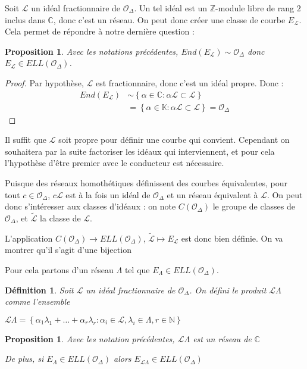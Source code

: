 \documentclass{article}
\newcommand{\N}[0]{\mathbb{N}}
\newcommand{\Z}[0]{\mathbb{Z}}
\newcommand{\C}[0]{\mathbb{C}}
\newcommand{\K}[0]{\mathbb{K}}
\newcommand{\OR}[0]{\mathcal{O}}
\newcommand{\LR}[0]{\mathcal{L}}
\newcommand{\CL}[0]{\tilde{\LR}}
\newtheorem{Prop}[The]{Proposition}
\newtheorem{Def}[The]{Définition}
\begin{document}
Soit $\LR$ un idéal fractionnaire de $\OR_{\Delta}$. Un tel idéal est un $\Z$-module libre de rang $2$ inclus dans $\C$, donc c'est un réseau. On peut donc créer une classe de courbe $E_{\LR}$. Cela permet de répondre à notre dernière question :

\begin{Prop}
	Avec les notations précédentes, $End(E_{\LR})\sim\OR_{\Delta}$ donc $E_{\LR}\in ELL(\OR_{\Delta})$.
\end{Prop}

\begin{proof}
	Par hypothèse, $\LR$ est fractionnaire, donc c'est un idéal propre. Donc :
	\begin{align*}
		End(E_{\LR})&\sim\left\lbrace\alpha\in\C : \alpha\LR\subset\LR\right\rbrace\\
		&= \left\lbrace\alpha\in\K : \alpha\LR\subset\LR\right\rbrace = \OR_{\Delta}
	\end{align*}
	
\end{proof}

Il suffit que $\LR$ soit propre pour définir une courbe qui convient. Cependant on souhaitera par la suite factoriser les idéaux qui interviennent, et pour cela l'hypothèse d'être premier avec le conducteur est nécessaire.

Puisque des réseaux homothétiques définissent des courbes équivalentes, pour tout $c\in\OR_{\Delta}$, $c\LR$ est à la fois un idéal de $\OR_{\Delta}$ et un réseau équivalent à $\LR$. On peut donc s'intéresser aux classes d'idéaux : on note $C(\OR_{\Delta})$ le groupe de classes de $\OR_{\Delta}$, et $\CL$ la classe de $\LR$. 

L'application $C(\OR_{\Delta})\rightarrow ELL(\OR_{\Delta})$, $\CL\mapsto E_{\LR}$ est donc bien définie. On va montrer qu'il s'agit d'une bijection

Pour cela partons d'un réseau $\Lambda$ tel que $E_{\Lambda}\in ELL(\OR_{\Delta})$. 

\begin{Def}
	Soit $\LR$ un idéal fractionnaire de $\OR_{\Delta}$. On défini le produit $\LR\Lambda$ comme l'ensemble 
	
	$\LR\Lambda = \left\lbrace \alpha_1\lambda_1 + \ldots + \alpha_r\lambda_r : \alpha_i\in\LR , \lambda_i\in\Lambda , r\in\N\right\rbrace$ 
\end{Def}
	
\begin{Prop}
	Avec les notation précédentes, $\LR\Lambda$ est un réseau de $\C$ 
	
	De plus, si $E_{\Lambda}\in ELL(\OR_{\Delta})$ alors $E_{\LR\Lambda}\in ELL(\OR_{\Delta})$
\end{Prop}
\end{document}
